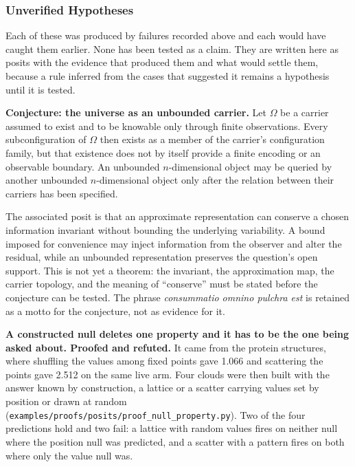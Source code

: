 \subsubsection{Unverified Hypotheses}

Each of these was produced by failures recorded above and each would have caught them earlier. None has been tested as a claim. They are written here as posits with the evidence that produced them and what would settle them, because a rule inferred from the cases that suggested it remains a hypothesis until it is tested.

\textbf{Conjecture: the universe as an unbounded carrier.} Let \(\Omega\) be a carrier assumed to exist and to be knowable only through finite observations. Every subconfiguration of \(\Omega\) then exists as a member of the carrier's configuration family, but that existence does not by itself provide a finite encoding or an observable boundary. An unbounded \(n\)-dimensional object may be queried by another unbounded \(n\)-dimensional object only after the relation between their carriers has been specified.

The associated posit is that an approximate representation can conserve a chosen information invariant without bounding the underlying variability. A bound imposed for convenience may inject information from the observer and alter the residual, while an unbounded representation preserves the question's open support. This is not yet a theorem: the invariant, the approximation map, the carrier topology, and the meaning of ``conserve'' must be stated before the conjecture can be tested. The phrase \emph{consummatio omnino pulchra est} is retained as a motto for the conjecture, not as evidence for it.

\textbf{A constructed null deletes one property and it has to be the one being asked about. Proofed and refuted.} It came from the protein structures, where shuffling the values among fixed points gave 1.066 and scattering the points gave 2.512 on the same live arm. Four clouds were then built with the answer known by construction, a lattice or a scatter carrying values set by position or drawn at random (\texttt{examples/\allowbreak{}proofs/\allowbreak{}posits/\allowbreak{}proof\_\allowbreak{}null\_\allowbreak{}property.\allowbreak{}py}). Two of the four predictions hold and two fail: a lattice with random values fires on neither null where the position null was predicted, and a scatter with a pattern fires on both where only the value null was.

